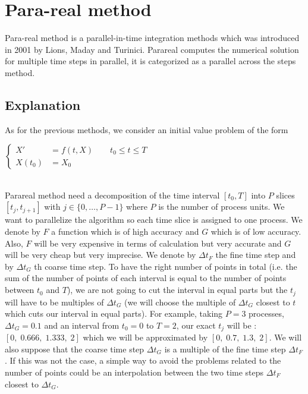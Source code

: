 \section{Para-real method}
	
Para-real method is a parallel-in-time integration methods which was introduced in 2001 by Lions, Maday and Turinici. Parareal computes the numerical solution for multiple time steps in parallel, it is categorized as a parallel across the steps method.

\subsection{Explanation}

As for the previous methods, we consider an initial value problem of the form \\
\begin{minipage}{\linewidth}
	\centering
	$\left\{\begin{aligned}
		X'&=f(t,X) \qquad t_0\le t\le T \\
		X(t_0)&=X_0
	\end{aligned}\right.$ \\
\end{minipage} \\

\noindent Parareal method need a decomposition of the time interval $[t_0,T]$ into $P$ slices $[t_j,t_{j+1}]$ with  $j\in\{0,\dots,P-1\}$ where $P$ is the number of process units. We want to parallelize the algorithm so each time slice is assigned to one process. We denote by $F$ a function which is of high accuracy and $G$ which is of low accuracy. Also, $F$ will be very expensive in terms of calculation but very accurate and $G$ will be very cheap but very imprecise. We denote by $\Delta t_F$ the fine time step and by $\Delta t_G$ th coarse time step. To have the right number of points in total (i.e. the sum of the number of points of each interval is equal to the number of points between $t_0$ and $T$), we are not going to cut the interval in equal parts but the $t_j$ will have to be multiples of $\Delta t_G$ (we will choose the multiple of $\Delta t_G$ closest to $t$ which cuts our interval in equal parts).
For example, taking $P=3$ processes, $\Delta t_G=0.1$ and an interval from $t_0=0$ to $T=2$, our exact $t_j$ will be : $[0,\;0.666,\;1.333,\;2]$ which we will be approximated  by $[0,\;0.7,\;1.3,\;2]$. We will also suppose that the coarse time step $\Delta t_G$ is a multiple of the fine time step $\Delta t_F$. If this was not the case, a simple way to avoid the problems related to the number of points could be an interpolation between the two time steps $\Delta t_F$ closest to $\Delta t_G$. \\

